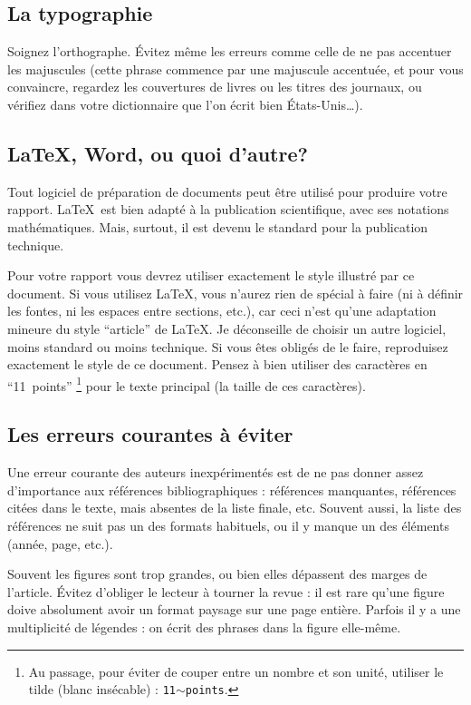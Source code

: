 \documentclass{ipgpmaster}
\begin{document}
\subsection{La typographie}

Soignez l'orthographe. Évitez même les erreurs comme celle de ne pas accentuer 
les majuscules (cette phrase commence par une majuscule accentuée, et pour vous
 con\-vain\-cre, regardez les couvertures de livres ou les titres des
journaux, ou vérifiez dans votre dictionnaire que l'on écrit bien 
États-Unis\dots).

\subsection{\LaTeX, Word, ou quoi d'autre?}

Tout logiciel de préparation de documents peut être utilisé pour produire 
votre rapport. \LaTeX \ est bien adapté à la publication scientifique, 
avec ses notations ma\-thé\-ma\-ti\-ques. Mais, surtout, il est devenu le 
standard pour la publication technique.

Pour votre rapport vous devrez utiliser exactement le style illustré par ce document. 
Si vous utilisez \LaTeX, vous n'aurez rien de spécial à faire 
(ni à définir les fontes, ni les espaces entre sections, etc.), car 
ceci n'est qu'une adaptation mineure du style ``article'' de \LaTeX.
Je déconseille de choisir un autre logiciel, moins standard ou moins technique.
Si vous \^{e}tes obligés de le faire, reproduisez exactement le style de ce 
document. Pensez à bien utiliser des caractères en ``11~points'' 
\footnote{Au passage, pour éviter de couper entre un nombre et son unité, 
utiliser le tilde (blanc insécable) : \texttt{11$\sim$points}.} 
pour le texte principal (la taille de ces caractères). 

\subsection{Les erreurs courantes  à éviter}

Une erreur courante des auteurs inexpérimentés est de ne pas donner assez
 d'importance aux références bibliographiques : références manquantes, 
références citées dans le texte, mais absentes de la liste finale, etc. 
Souvent aussi, la liste des références ne suit pas un des formats habituels, 
ou il y manque un des éléments (année, page, etc.).

Souvent les figures sont trop grandes, ou bien elles dépassent des marges de 
l'article. 
Évitez d'obliger le lecteur à tourner la revue : il est rare qu'une figure
 doive absolument avoir un format paysage sur une page entière.
Parfois il y a une multiplicité de légendes : on écrit des phrases dans la
 figure elle-même.      
\end{document}
